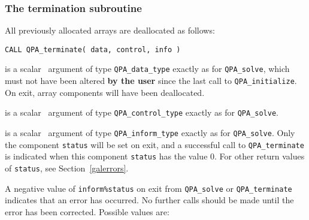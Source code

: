 \documentclass{galahad}
\newcommand{\packagename}{QPA}
\begin{document}

\subsubsection{The  termination subroutine}
All previously allocated arrays are deallocated as follows:
\vspace*{1mm}

\hspace{8mm}
{\tt CALL \packagename\_terminate( data, control, info )}

\vspace*{-3mm}
\begin{description}

 is a scalar \intentinout\ argument of type 
{\tt \packagename\_data\_type} 
exactly as for
{\tt \packagename\_solve},
which must not have been altered {\bf by the user} since the last call to 
{\tt \packagename\_initialize}.
On exit, array components will have been deallocated.

 is a scalar \intentin\ argument of type 
{\tt \packagename\_control\_type}
exactly as for
{\tt \packagename\_solve}.

 is a scalar \intentout\ argument of type 
{\tt \packagename\_inform\_type}
exactly as for
{\tt \packagename\_solve}.
Only the component {\tt status} will be set on exit, and a 
successful call to 
{\tt \packagename\_terminate}
is indicated when this  component {\tt status} has the value 0. 
For other return values of {\tt status}, see Section~\ref{galerrors}.

\end{description}


\galerrors
A negative value of {\tt inform\%status} on exit from 
{\tt \packagename\_solve}
or 
{\tt \packagename\_terminate}
indicates that an error has occurred. No further calls should be made
until the error has been corrected. Possible values are:
\end{document}
